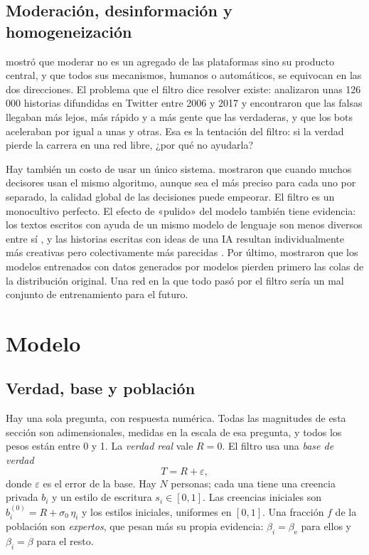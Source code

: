 \documentclass[11pt,a4paper]{article}
\begin{document}
\subsection{Moderación, desinformación y homogeneización}

\textcite{gillespie2018} mostró que moderar no es un agregado de las plataformas sino su producto central, y que todos sus mecanismos, humanos o automáticos, se equivocan en las dos direcciones. El problema que el filtro dice resolver existe: \textcite{vosoughi2018} analizaron unas 126\,000 historias difundidas en Twitter entre 2006 y 2017 y encontraron que las falsas llegaban más lejos, más rápido y a más gente que las verdaderas, y que los bots aceleraban por igual a unas y otras. Esa es la tentación del filtro: si la verdad pierde la carrera en una red libre, ¿por qué no ayudarla?

Hay también un costo de usar un único sistema. \textcite{kleinberg2021} mostraron que cuando muchos decisores usan el mismo algoritmo, aunque sea el más preciso para cada uno por separado, la calidad global de las decisiones puede empeorar. El filtro es un monocultivo perfecto. El efecto de «pulido» del modelo también tiene evidencia: los textos escritos con ayuda de un mismo modelo de lenguaje son menos diversos entre sí \parencite{padmakumar2024}, y las historias escritas con ideas de una IA resultan individualmente más creativas pero colectivamente más parecidas \parencite{doshi2024}. Por último, \textcite{shumailov2024} mostraron que los modelos entrenados con datos generados por modelos pierden primero las colas de la distribución original. Una red en la que todo pasó por el filtro sería un mal conjunto de entrenamiento para el futuro.

\section{Modelo}\label{sec:modelo}

\subsection{Verdad, base y población}

Hay una sola pregunta, con respuesta numérica. Todas las magnitudes de esta sección son adimensionales, medidas en la escala de esa pregunta, y todos los pesos están entre 0 y 1. La \emph{verdad real} vale $R = 0$. El filtro usa una \emph{base de verdad}
\begin{equation}\label{eq:base}
T = R + \varepsilon ,
\end{equation}
donde $\varepsilon$ es el error de la base. Hay $N$ personas; cada una tiene una creencia privada $b_i$ y un estilo de escritura $s_i \in [0,1]$. Las creencias iniciales son $b_i^{(0)} = R + \sigma_0\,\eta_i$ y los estilos iniciales, uniformes en $[0,1]$. Una fracción $f$ de la población son \emph{expertos}, que pesan más su propia evidencia: $\beta_i = \beta_{\mathrm{e}}$ para ellos y $\beta_i = \beta$ para el resto.
\end{document}

